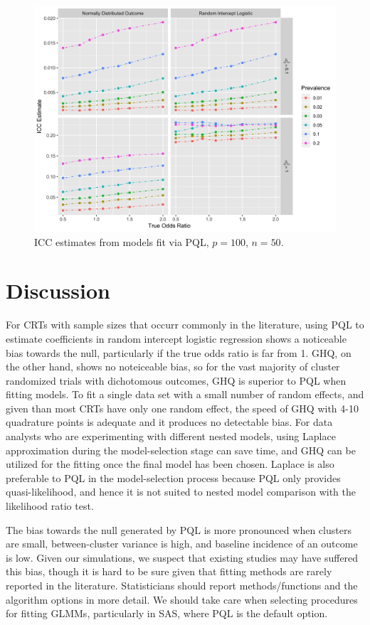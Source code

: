 \documentclass{article}
\begin{document}
\begin{flushleft}
\begin{figure}[]
\begin{center}
\includegraphics[width=12cm]{_icc_p100_n50.png}
  \caption{ICC estimates from models fit via PQL, $p=100$, $n=50$.}
    \label{fig:_icc}
\end{center}
\end{figure}


\section{Discussion}

For CRTs with sample sizes that occurr commonly in the literature, using PQL to estimate coefficients in random intercept logistic regression shows a noticeable bias towards the null, particularly if the true odds ratio is far from 1. GHQ, on the other hand, shows no noteiceable bias, so for the vast majority of cluster randomized trials with dichotomous outcomes, GHQ is superior to PQL when fitting models. To fit a single data set with a small number of random effects, and given than most CRTs have only one random effect, the speed of GHQ with 4-10 quadrature points is adequate and it produces no detectable bias. For data analysts who are experimenting with different nested models, using Laplace approximation during the model-selection stage can save time, and GHQ can be utilized for the fitting once the final model has been chosen. Laplace is also preferable to PQL in the model-selection process because PQL only provides quasi-likelihood, and hence it is not suited to nested model comparison with the likelihood ratio test.

The bias towards the null generated by PQL is more pronounced when clusters are small, between-cluster variance is high, and baseline incidence of an outcome is low. Given our simulations, we suspect that existing studies may have suffered this bias, though it is hard to be sure given that fitting methods are rarely reported in the literature. Statisticians should report methods/functions and the algorithm options in more detail.  We should take care when selecting procedures for fitting GLMMs, particularly in SAS, where PQL is the default option.


\end{flushleft}
\end{document}
